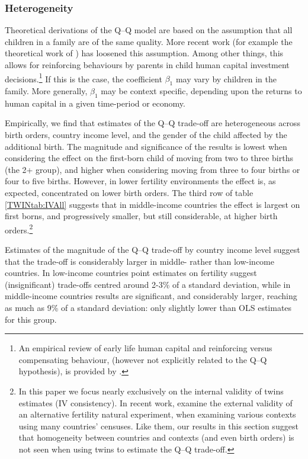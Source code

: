 \documentclass[subeqn]{article}
\begin{document}
\begin{spacing}{1.4}
\subsubsection{Heterogeneity}
Theoretical derivations of the Q--Q model are based on the assumption that all
children in a family are of the same quality. More recent work (for example the 
theoretical work of \citet{AizerCunha2012}) has loosened this assumption. Among 
other things, this allows for reinforcing behaviours by parents in child human 
capital investment decisions.\footnote{An empirical review of early life human 
capital and reinforcing versus compensating behaviour, (however not explicitly 
related to the Q--Q hypothesis), is provided by \citet{AlmondMazumder2013}.} If 
this is the case, the coefficient $\beta_1$ may vary by children in the family. 
More generally, $\beta_1$ may be context specific, depending upon the returns to 
human capital in a given time-period or economy.

Empirically, we find that estimates of the Q--Q trade-off are heterogeneous 
across birth orders, country income level, and the gender of the child affected 
by the additional birth. The magnitude and significance of the results is lowest 
when considering the effect on the first-born child of moving from two to three 
births (the 2+ group), and higher when considering moving from three to four 
births or four to five births. However, in lower fertility environments the 
effect is, as expected, concentrated on lower birth orders. The third row of 
table \ref{TWINtab:IVAll} suggests that in middle-income countries the effect is 
largest on first borns, and progressively smaller, but still considerable, at 
higher birth orders.\footnote{In this paper we focus nearly exclusively on
the internal validity of twins estimates (IV consistency).  In recent work,
\citet{Deheijaetal2015} examine the external validity of an alternative 
fertility natural experiment, when examining various contexts using many
countries' censuses.  Like them, our results in this section suggest that
homogeneity between countries and contexts (and even birth orders) is not
seen when using twins to estimate the Q--Q trade-off.}

Estimates of the magnitude of the Q--Q trade-off by country income level suggest 
that the trade-off is considerably larger in middle- rather than low-income 
countries. In low-income countries point estimates on fertility suggest 
(insignificant) trade-offs centred around 2-3\% of a standard deviation, while 
in middle-income countries results are significant, and considerably larger,
reaching as much as 9\% of a standard deviation: only slightly lower than OLS 
estimates for this group.


\end{spacing}
\end{document}
